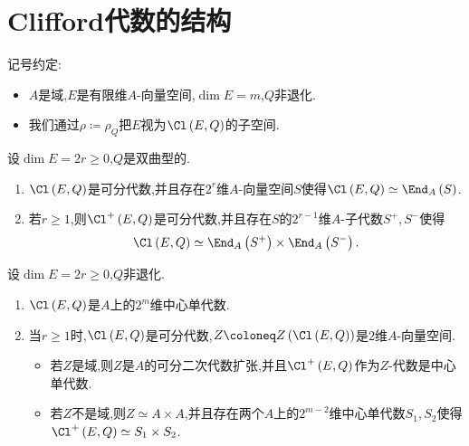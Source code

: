 \section{Clifford代数的结构}

记号约定:
\begin{itemize}
	\item $A$是域,$E$是有限维$A$-向量空间,$\dim E=m$,$Q$非退化.
	\item 我们通过$\rho\coloneq\rho_{Q}$把$E$视为$\Cl\left(E,Q\right)$的子空间.
\end{itemize}

\begin{theorem}{}{}
	设$\dim E=2r\geq 0$,$Q$是双曲型的.
	\begin{enumerate}
		\item $\Cl\left(E,Q\right)$是可分代数,并且存在$2^{r}$维$A$-向量空间$S$使得$\Cl\left(E,Q\right)\simeq\End_{A}\left(S\right)$.
		\item 若$r\geq 1$,则$\Cl^{+}\left(E,Q\right)$是可分代数,并且存在$S$的$2^{r-1}$维$A$-子代数$S^{+},S^{-}$使得
		\begin{align*}
			\Cl\left(E,Q\right)\simeq\End_{A}\left(S^{+}\right)\times\End_{A}\left(S^{-}\right).
		\end{align*}
	\end{enumerate}
\end{theorem}

\begin{corollary}{}{}
	设$\dim E=2r\geq 0$,$Q$非退化.
	\begin{enumerate}
		\item $\Cl\left(E,Q\right)$是$A$上的$2^{m}$维中心单代数.
		\item 当$r\geq 1$时,$\Cl\left(E,Q\right)$是可分代数,$Z\coloneq Z\left(\Cl\left(E,Q\right)\right)$是$2$维$A$-向量空间.
		\begin{itemize}
			\item 若$Z$是域,则$Z$是$A$的可分二次代数扩张,并且$\Cl^{+}\left(E,Q\right)$作为$Z$-代数是中心单代数.
			\item 若$Z$不是域,则$Z\simeq A\times A$,并且存在两个$A$上的$2^{m-2}$维中心单代数$S_{1},S_{2}$使得$\Cl^{+}\left(E,Q\right)\simeq S_{1}\times S_{2}$.
		\end{itemize}
	\end{enumerate}
\end{corollary}

